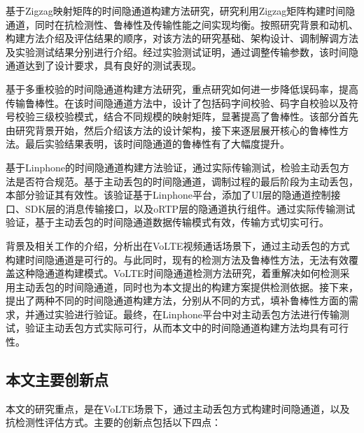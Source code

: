 基于Zigzag映射矩阵的时间隐通道构建方法研究，研究利用Zigzag矩阵构建时间隐通道，同时在抗检测性、鲁棒性及传输性能之间实现均衡。按照研究背景和动机、构建方法介绍及评估结果的顺序，对该方法的研究基础、架构设计、调制解调方法及实验测试结果分别进行介绍。经过实验测试证明，通过调整传输参数，该时间隐通道达到了设计要求，具有良好的测试表现。

基于多重校验的时间隐通道构建方法研究，重点研究如何进一步降低误码率，提高传输鲁棒性。在该时间隐通道方法中，设计了包括码字间校验、码字自校验以及符号校验三级校验模式，结合不同规模的映射矩阵，显著提高了鲁棒性。该部分首先由研究背景开始，然后介绍该方法的设计架构，接下来逐层展开核心的鲁棒性方法。最后实验结果表明，该时间隐通道的鲁棒性有了大幅度提升。

基于Linphone的时间隐通道构建方法验证，通过实际传输测试，检验主动丢包方法是否符合规范。基于主动丢包的时间隐通道，调制过程的最后阶段为主动丢包，本部分验证其有效性。该验证基于Linphone平台，添加了UI层的隐通道控制接口、SDK层的消息传输接口，以及oRTP层的隐通道执行组件。通过实际传输测试验证，基于主动丢包的时间隐通道数据传输模式有效，传输方式切实可行。

背景及相关工作的介绍，分析出在VoLTE视频通话场景下，通过主动丢包的方式构建时间隐通道是可行的。与此同时，现有的检测方法及鲁棒性方法，无法有效覆盖这种隐通道构建模式。VoLTE时间隐通道检测方法研究，着重解决如何检测采用主动丢包的时间隐通道，同时也为本文提出的构建方案提供检测依据。接下来，提出了两种不同的时间隐通道构建方法，分别从不同的方式，填补鲁棒性方面的需求，并通过实验进行验证。最终，在Linphone平台中对主动丢包方法进行传输测试，验证主动丢包方式实际可行，从而本文中的时间隐通道构建方法均具有可行性。

\subsection{本文主要创新点}
\label{sec:intro:work:inno}

本文的研究重点，是在VoLTE场景下，通过主动丢包方式构建时间隐通道，以及抗检测性评估方式。主要的创新点包括以下四点：


